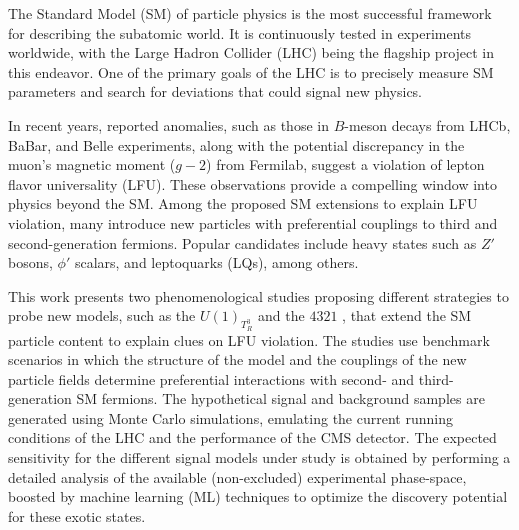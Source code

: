 The Standard Model (SM) of particle physics is the most successful framework for describing the subatomic world. It is continuously tested in experiments worldwide, with the Large Hadron Collider (LHC) being the flagship project in this endeavor. One of the primary goals of the LHC is to precisely measure SM parameters and search for deviations that could signal new physics.  

In recent years, reported anomalies, such as those in $B$-meson decays from LHCb, BaBar, and Belle experiments, along with the potential discrepancy in the muon's magnetic moment ($g-2$) from Fermilab, suggest a violation of lepton flavor universality (LFU). These observations provide a compelling window into physics beyond the SM. Among the proposed SM extensions to explain LFU violation, many introduce new particles with preferential couplings to third and second-generation fermions. Popular candidates include heavy states such as $Z'$ bosons, $\phi'$ scalars, and leptoquarks (LQs), among others.

This work presents two phenomenological studies proposing different strategies to probe new models, such as the $U(1)_{T^3_R}$ \cite{Qureshi:2024naw} and the $4321$ \cite{Florez2023}, that extend the SM particle content to explain clues on LFU violation. The studies use benchmark scenarios in which the structure of the model and the couplings of the new particle fields determine preferential interactions with second- and third-generation SM fermions. The hypothetical signal and background samples are generated using Monte Carlo simulations, emulating the current running conditions of the LHC and the performance of the CMS detector. The expected sensitivity for the different signal models under study is obtained by performing a detailed analysis of the available (non-excluded) experimental phase-space, boosted by  machine learning (ML) techniques to optimize the discovery potential for these exotic states.